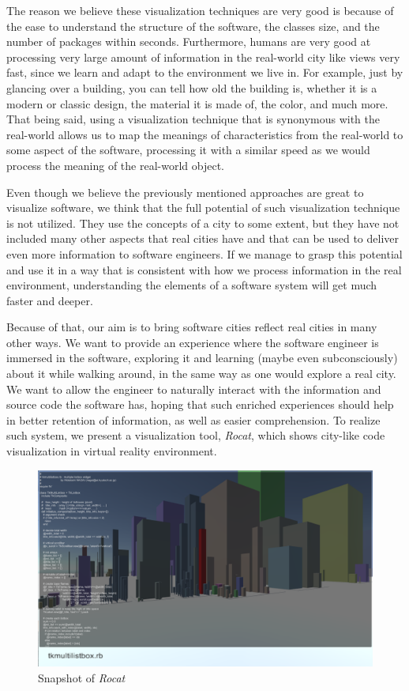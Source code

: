 \documentclass[conference]{IEEEtran}
\begin{document}
The reason we believe these visualization techniques are very good is because of the ease to understand the structure of the software, the classes size, and the number of packages within seconds.
Furthermore, humans are very good at processing very large amount of information in the real-world city like views very fast, since we learn and adapt to the environment we live in.
For example, just by glancing over a building, you can tell how old the building is, whether it is a modern or classic design, the material it is made of, the color, and much more.
That being said, using a visualization technique that is synonymous with the real-world allows us to map the meanings of characteristics from the real-world to some aspect of the software, processing it with a similar speed as we would process the meaning of the real-world object.

Even though we believe the previously mentioned approaches are great to visualize software, we think that the full potential of such visualization technique is not utilized.
They use the concepts of a city to some extent, but they have not included many other aspects that real cities have and that can be used to deliver even more information to software engineers.
If we manage to grasp this potential and use it in a way that is consistent with how we process information in the real environment, understanding the elements of a software system will get much faster and deeper.

Because of that, our aim is to bring software cities reflect real cities in many other ways.
We want to provide an experience where the software engineer is immersed in the software, exploring it and learning (maybe even subconsciously) about it while walking around, in the same way as one would explore a real city.
We want to allow the engineer to naturally interact with the information and source code the software has, hoping that such enriched experiences should help in better retention of information, as well as easier comprehension.
To realize such system, we present a visualization tool, \textit{Rocat}, which shows city-like code visualization in virtual reality environment.

\begin{figure}[t!]
\centering
\includegraphics[bb=0 0 1598 937, width=18cm]{rocat.png}
\caption{Snapshot of \textit{Rocat}}
\label{figure:Rocat}
\end{figure}
\end{document}
